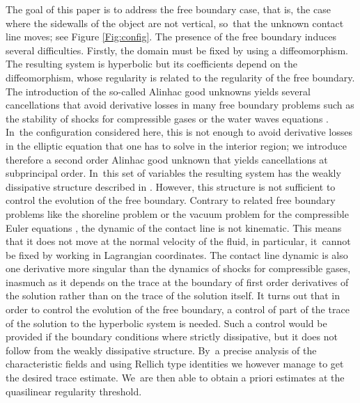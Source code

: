 \documentclass[11pt]{article}
\theoremstyle{definition}
\begin{document}
The goal of this paper is to address the free boundary case, that is,
the case where the sidewalls of the object are not vertical, so~that the unknown contact line moves; see Figure \ref{Fig:config}.
The presence of the free boundary induces several difficulties.
Firstly, the domain must be fixed by using a diffeomorphism.
The resulting system is hyperbolic but its coefficients depend on the diffeomorphism, whose regularity is related to the regularity of the free boundary.
The introduction of the so-called Alinhac good unknowns \cite{Alinhac} yields several cancellations that avoid derivative losses in many free boundary problems
such as the stability of shocks for compressible gases \cite{Majda,Metivier} or the water waves equations \cite{Lannes2005,Iguchi,AlazardMetivier}. In~the configuration considered here, this is not enough to avoid derivative losses in the elliptic equation that one has to solve in the interior region;
we introduce therefore a second order Alinhac good unknown that yields cancellations at subprincipal order. In~this set of variables the resulting system has the weakly dissipative structure described in \cite{IguchiLannes2023}.
However, this structure is not sufficient to control the evolution of the free boundary.
Contrary to related free boundary problems like the shoreline problem \cite{LannesMetivier,Poyferre,MingWang} or
the vacuum problem for the compressible Euler equations \cite{CoutandShkoller,JangMasmoudi,IfrimTataru}, the dynamic of the contact line is not kinematic.
This means that it does not move at the normal velocity of the fluid, in particular, it~cannot be fixed by working in Lagrangian coordinates.
The contact line dynamic is also one derivative more singular than the dynamics of shocks for compressible gases,
inasmuch as it depends on the trace at the boundary of first order derivatives of the solution rather than on the trace of the solution itself.
It turns out that in order to control the evolution of the free boundary, a control of part of the trace of the solution to the hyperbolic system is needed.
Such a control would be provided if the boundary conditions where strictly dissipative, but it does not follow from the weakly dissipative structure. By~a precise analysis of the characteristic fields and using Rellich type identities we however manage to get the desired trace estimate. We~are then able to obtain a priori estimates at the quasilinear regularity threshold.
\end{document}
